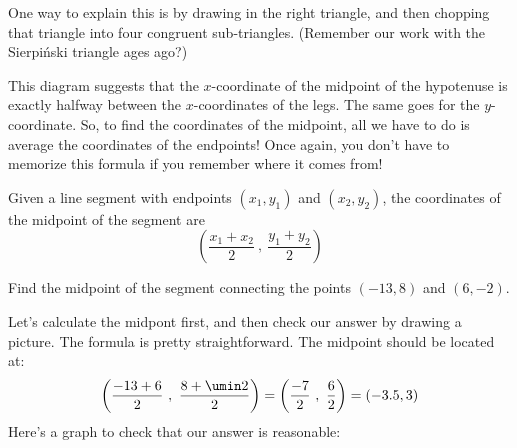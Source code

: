 One way to explain this is by drawing in the right triangle, and then chopping that triangle into four congruent sub-triangles. (Remember our work with the Sierpi\'{n}ski triangle ages ago?)
\begin{center}
\end{center}
This diagram suggests that the $x$-coordinate of the midpoint of the hypotenuse is exactly halfway between the $x$-coordinates of the legs. The same goes for the $y$-coordinate. So, to find the coordinates of the midpoint, all we have to do is average the coordinates of the endpoints! Once again, you don't have to memorize this formula if you remember where it comes from!


\begin{boxdef}
Given a line segment with endpoints $(x_1, y_1)$ and $(x_2, y_2)$, the coordinates of the midpoint of the segment are \[\left( \frac{x_1+x_2}{2} ~,~ \frac{y_1+y_2}{2} \right)\]
\end{boxdef}

\begin{boxex}
Find the midpoint of the segment connecting the points $(-13,8)$ and $(6, -2)$.

 Let's calculate the midpont first, and then check our answer by drawing a picture. The formula is pretty straightforward. The midpoint should be located at: \[\left( \frac{-13+6}{2} ~,~ \frac{8+\umin2}{2} \right) = \left( \frac{-7}{2} ~,~ \frac{6}{2} \right) = (-3.5, 3) \]
Here's a graph to check that our answer is reasonable:
\begin{center}
\end{center}
\end{boxex}

